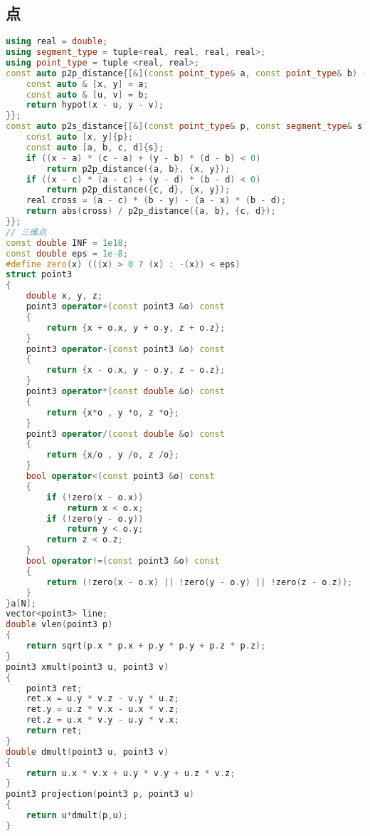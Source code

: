 \subsection{点}
  \begin{lstlisting}[language=c++]
using real = double;
using segment_type = tuple<real, real, real, real>;
using point_type = tuple <real, real>;
const auto p2p_distance{[&](const point_type& a, const point_type& b) {
    const auto & [x, y] = a;
    const auto & [u, v] = b;
    return hypot(x - u, y - v);
}};
const auto p2s_distance{[&](const point_type& p, const segment_type& s) {
    const auto [x, y]{p};
    const auto [a, b, c, d]{s};
    if ((x - a) * (c - a) + (y - b) * (d - b) < 0) 
        return p2p_distance({a, b}, {x, y});
    if ((x - c) * (a - c) + (y - d) * (b - d) < 0)
        return p2p_distance({c, d}, {x, y});
    real cross = (a - c) * (b - y) - (a - x) * (b - d);
    return abs(cross) / p2p_distance({a, b}, {c, d});
}};
// 三维点
const double INF = 1e18;
const double eps = 1e-8;
#define zero(x) (((x) > 0 ? (x) : -(x)) < eps)
struct point3
{
    double x, y, z;
    point3 operator+(const point3 &o) const
    {
        return {x + o.x, y + o.y, z + o.z};
    }
    point3 operator-(const point3 &o) const
    {
        return {x - o.x, y - o.y, z - o.z};
    }
    point3 operator*(const double &o) const
    {
        return {x*o , y *o, z *o};
    }
    point3 operator/(const double &o) const
    {
        return {x/o , y /o, z /o};
    }
    bool operator<(const point3 &o) const
    {
        if (!zero(x - o.x))
            return x < o.x;
        if (!zero(y - o.y))
            return y < o.y;
        return z < o.z;
    }
    bool operator!=(const point3 &o) const
    {
        return (!zero(x - o.x) || !zero(y - o.y) || !zero(z - o.z));
    }
}a[N];
vector<point3> line;
double vlen(point3 p)
{
    return sqrt(p.x * p.x + p.y * p.y + p.z * p.z);
}
point3 xmult(point3 u, point3 v)
{
    point3 ret;
    ret.x = u.y * v.z - v.y * u.z;
    ret.y = u.z * v.x - u.x * v.z;
    ret.z = u.x * v.y - u.y * v.x;
    return ret;
}
double dmult(point3 u, point3 v)
{
    return u.x * v.x + u.y * v.y + u.z * v.z;
}
point3 projection(point3 p, point3 u)
{
    return u*dmult(p,u);
}
  \end{lstlisting}
